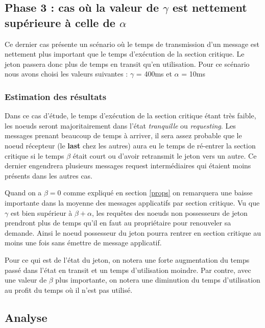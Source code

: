 \documentclass[12pt,a4paper]{article}
\begin{document}
\subsection{Phase 3 : cas où la valeur de $\gamma$ est nettement supérieure à celle de $\alpha$ \label{troisieme}}

Ce dernier cas présente un scénario où le temps de transmission d’un message est nettement plus important que le temps d'exécution de la section critique. Le jeton passera donc plus de temps en transit qu'en utilisation. Pour ce scénario nous avons choisi les valeurs suivantes : $\gamma$ = 400ms et $\alpha$ = 10ms

\subsubsection{Estimation des résultats}

Dans ce cas d'étude, le temps d'exécution de la section critique étant très faible, les noeuds seront majoritairement dans l'état \textit{tranquille} ou \textit{requesting}. Les messages prenant beaucoup de temps à arriver, il sera assez probable que le noeud récepteur (le \textbf{last} chez les autres) aura eu le temps de ré-entrer la section critique si le temps $\beta$ était court ou d'avoir retransmit le jeton vers un autre. Ce dernier engendrera plusieurs messages request intermédiaires qui étaient moins présents dans les autres cas.  

Quand on a $\beta = 0$ comme expliqué en section \ref{props} on remarquera une baisse importante dans la moyenne des messages applicatifs par section critique. Vu que $\gamma$ est bien supérieur à $\beta + \alpha$, les requêtes des noeuds non possesseurs de jeton prendront plus de temps qu'il en faut au propriétaire pour renouveler sa demande. Ainsi le noeud possesseur du jeton pourra rentrer en section critique au moins une fois sans émettre de message applicatif.

Pour ce qui est de l'état du jeton, on notera une forte augmentation du temps passé dans l'état en transit et un temps d'utilisation moindre. Par contre, avec une valeur de $\beta$ plus importante, on notera une diminution du temps d'utilisation au profit du temps où il n'est pas utilisé.

\subsection{Analyse}
\end{document}
